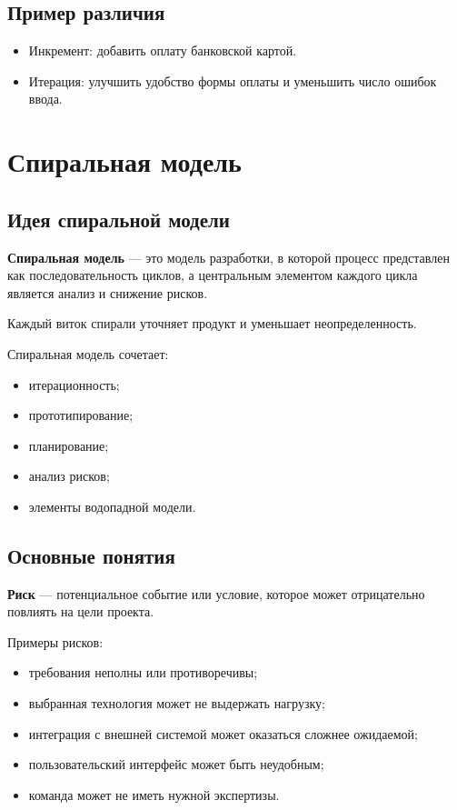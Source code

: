 \documentclass[12pt,a4paper]{article}
\begin{document}
\subsection{Пример различия}

\begin{itemize}
    \item Инкремент: добавить оплату банковской картой.
    \item Итерация: улучшить удобство формы оплаты и уменьшить число ошибок ввода.
\end{itemize}

\section{Спиральная модель}

\subsection{Идея спиральной модели}

\textbf{Спиральная модель} --- это модель разработки, в которой процесс представлен как последовательность циклов, а центральным элементом каждого цикла является анализ и снижение рисков.

Каждый виток спирали уточняет продукт и уменьшает неопределенность.

Спиральная модель сочетает:
\begin{itemize}
    \item итерационность;
    \item прототипирование;
    \item планирование;
    \item анализ рисков;
    \item элементы водопадной модели.
\end{itemize}

\subsection{Основные понятия}

\textbf{Риск} --- потенциальное событие или условие, которое может отрицательно повлиять на цели проекта.

Примеры рисков:
\begin{itemize}
    \item требования неполны или противоречивы;
    \item выбранная технология может не выдержать нагрузку;
    \item интеграция с внешней системой может оказаться сложнее ожидаемой;
    \item пользовательский интерфейс может быть неудобным;
    \item команда может не иметь нужной экспертизы.
\end{itemize}
\end{document}
